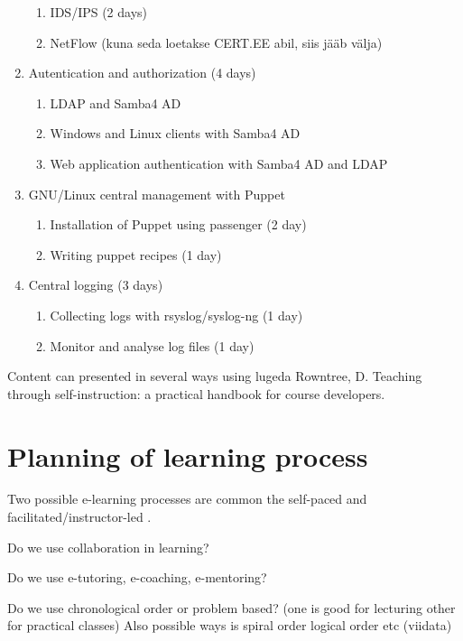 \begin{enumerate}[label=Hands-on block \arabic*.,leftmargin=*]
\begin{enumerate}[label=LAB \arabic*.,leftmargin=*]
	  	\item IDS/IPS (2 days)
  		\item NetFlow (kuna seda loetakse CERT.EE abil, siis jääb välja)
    \end{enumerate}
    \item Autentication and authorization (4 days)
        \begin{enumerate}[label=LAB \arabic*.,leftmargin=*]
  		\item LDAP and Samba4 AD
	  	\item Windows and Linux clients with Samba4 AD 
  		\item Web application authentication with Samba4 AD and LDAP
    		\end{enumerate}
    \item GNU/Linux central management with Puppet
        \begin{enumerate}[label=LAB \arabic*.,leftmargin=*]
	  		\item Installation of Puppet using passenger (2 day)
		  	\item Writing puppet recipes (1 day)
    		\end{enumerate}
    	\item Central logging (3 days)
    	    \begin{enumerate}[label=LAB \arabic*.,leftmargin=*]
	  		\item Collecting logs with rsyslog/syslog-ng (1 day)
		  	\item Monitor and analyse log files (1 day)
    		\end{enumerate}
\end{enumerate}

Content can presented in several ways using {\color{red} lugeda Rowntree, D. Teaching through self-instruction: a practical handbook for course developers.} \citep{rowntree1986teaching}


\section{Planning of learning process}
Two possible e-learning processes are common the self-paced and facilitated/instructor-led \citep[p.~10]{food2011learning}.

Do we use collaboration in learning? 

Do we use  e-tutoring, e-coaching, e-mentoring?

Do we use chronological order or problem based? (one is good for lecturing other for practical classes) Also possible ways is spiral order logical order etc {\color{red} (viidata) }

